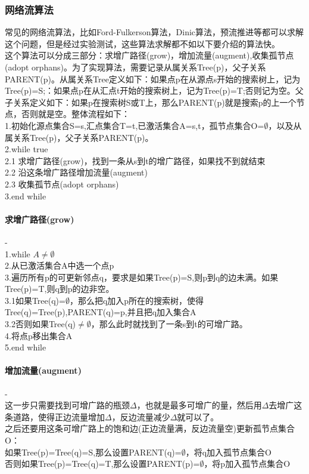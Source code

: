 \documentclass[11pt,a4,notitlepage]{article}
\begin{document}
\begin{CJK}{UTF8}{gkai}
\subsubsection*{网络流算法}
常见的网络流算法，比如Ford-Fulkerson算法，Dinic算法，预流推进等都可以求解这个问题，但是经过实验测试，这些算法求解都不如以下要介绍的算法快。\cite{name2}\\
这个算法可以分成三部分：求增广路径(grow)，增加流量(augment),收集孤节点(adopt orphans)。为了实现算法，需要记录从属关系Tree(p)，父子关系PARENT(p)。从属关系Tree定义如下：如果点p在从源点s开始的搜索树上，记为Tree(p)=S;：如果点p在从汇点t开始的搜索树上，记为Tree(p)=T;否则记为空。父子关系定义如下：如果p在搜索树S或T上，那么PARENT(p)就是搜索p的上一个节点，否则就是空。整体流程如下：\\
1.初始化源点集合S={s},汇点集合T={t},已激活集合A={s,t}，孤节点集合O=$\emptyset$，以及从属关系Tree(p)，父子关系PARENT(p)。\\
2.while true\\
2.1 \qquad 求增广路径(grow)，找到一条从s到t的增广路径，如果找不到就结束\\
2.2 \qquad 沿这条增广路径增加流量(augment)\\
2.3 \qquad 收集孤节点(adopt orphans)\\
3.end while
\newpage
\paragraph*{求增广路径(grow)}-\\
1.while $A \ne \emptyset$\\
2.\qquad 从已激活集合A中选一个点p\\
3.\qquad 遍历所有p的可更新邻点q，要求是如果Tree(p)=S,则p到q的边未满。如果Tree(p)=T,则q到p的边非空。\\
3.1\qquad \qquad 如果Tree(q)=$\emptyset$，那么把q加入p所在的搜索树，使得Tree(q)=Tree(p),PARENT(q)=p,并且把q加入集合A\\
3.2\qquad\qquad 否则如果Tree(q)$\ne \emptyset$，那么此时就找到了一条s到t的可增广路。\\
4.\qquad 将点p移出集合A\\
5.end while
\paragraph*{增加流量(augment)}-\\
这一步只需要找到可增广路的瓶颈$\Delta$，也就是最多可增广的量，然后用$\Delta$去增广这条道路，使得正边流量增加$\Delta$，反边流量减少$\Delta$就可以了。\\
之后还要用这条可增广路上的饱和边(正边流量满，反边流量空)更新孤节点集合O：\\
如果Tree(p)=Tree(q)=S,那么设置PARENT(q)=$\emptyset$，将q加入孤节点集合O\\
否则如果Tree(p)=Tree(q)=T,那么设置PARENT(p)=$\emptyset$，将p加入孤节点集合O\\

\end{CJK}
\end{document}
